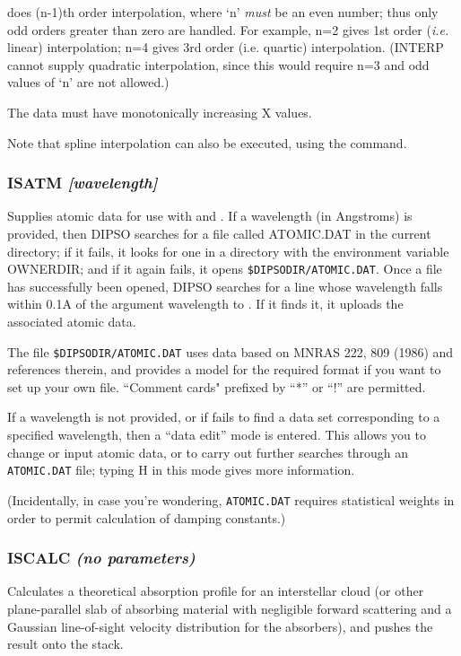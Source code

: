 \documentclass[twoside,11pt,noabs,nolof]{starlink}
\providecommand{\dipcom}[3]{\subsubsection*{\label{COM:#1}\textbf{#1} \emph{#2}}}
\begin{document}
  does (n-1)th order interpolation, where `n' \textit{must}\/ be an
even number; thus only odd orders greater than zero are handled.
For example, n=2 gives 1st order (\emph{i.e.} linear) interpolation;
n=4 gives 3rd order (i.e. quartic) interpolation. (INTERP cannot
supply quadratic interpolation, since this would require n=3 and odd
values of `n' are not allowed.)

The data must have monotonically increasing X values.

Note that spline interpolation can also be executed, using the 
command.

\dipcom{ISATM}{[wavelength]}{Reads atomic data from a disk file for use with {\texttt{ISCALC}} and {\texttt{ISCOG}}}
Supplies atomic data for use with   and .  If a wavelength (in
Angstroms) is provided, then DIPSO searches for a file called ATOMIC.DAT in the
current directory; if it fails, it looks for one in a directory with the
environment variable OWNERDIR; and if it again fails, it opens
{\texttt{\$DIPSODIR/ATOMIC.DAT}}.  Once a
file has successfully been opened, DIPSO searches for a line whose wavelength
falls within 0.1A of the argument wavelength to .  If it finds it, it
uploads the associated atomic data.

The file {\texttt{\$DIPSODIR/ATOMIC.DAT}}  uses data based on MNRAS 222, 809 (1986)
and references therein, and provides a model for the required format
if you want to set up your own file.
``Comment cards" prefixed by ``*'' or ``!'' are permitted.

If a wavelength is not provided, or if   fails to find a data set
corresponding to a specified wavelength, then a ``data edit'' mode is
entered. This allows you to change or input atomic data, or to carry
out further searches through an {\texttt{ATOMIC.DAT}}  file; typing H in
this mode gives more information.

(Incidentally, in case you're wondering, {\texttt{ATOMIC.DAT}}  requires
statistical weights in order to permit calculation of damping
constants.)

\dipcom{ISCALC}{(no parameters)}{Creates a theoretical absorption profile for an interstellar cloud}
Calculates a theoretical absorption profile for an interstellar cloud
(or other plane-parallel slab of absorbing material with negligible
forward scattering and a Gaussian line-of-sight velocity distribution
for the absorbers), and pushes the result onto the stack.
\end{document}
